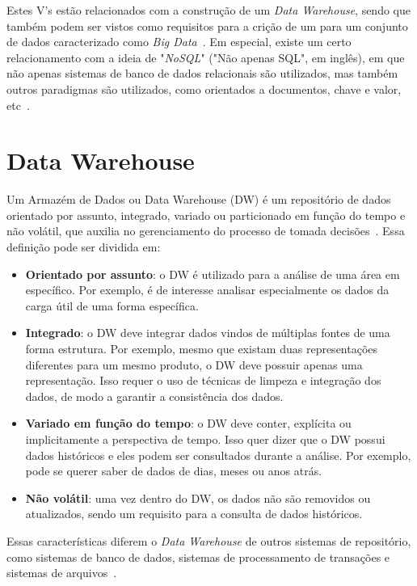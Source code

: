 Estes V's estão relacionados com a construção de um \textit{Data Warehouse}, sendo que também podem ser vistos como requisitos para a crição de um para um conjunto de dados caracterizado como \textit{Big Data}~\cite{zhangBigDataFramework2017}.
Em especial, existe um certo relacionamento com a ideia de "\textit{NoSQL}" ("Não apenas SQL", em inglês), em que não apenas sistemas de banco de dados relacionais são utilizados, mas também outros paradigmas são utilizados, como orientados a documentos, chave e valor, etc~\cite{bimonteOpenIssuesBig2016}.

\section{Data Warehouse}
\label{ch:fun:dw}

Um Armazém de Dados ou Data Warehouse (DW) é um repositório de dados orientado por assunto, integrado, variado ou particionado em função do tempo e não volátil, que auxilia no gerenciamento do processo de tomada decisões~\cite{inmonUsingDataWarehouse1994}.
Essa definição pode ser dividida em:

\begin{itemize}
	\item \textbf{Orientado por assunto}: o DW é utilizado para a análise de uma área em específico.
Por exemplo, é de interesse analisar especialmente os dados da carga útil de uma forma específica.
	\item \textbf{Integrado}: o DW deve integrar dados vindos de múltiplas fontes de uma forma estrutura.
Por exemplo, mesmo que existam duas representações diferentes para um mesmo produto, o DW deve possuir apenas uma representação.
Isso requer o uso de técnicas de limpeza e integração dos dados, de modo a garantir a consistência dos dados.
	\item \textbf{Variado em função do tempo}: o DW deve conter, explícita ou implicitamente a perspectiva de tempo.
Isso quer dizer que o DW possui dados históricos e eles podem ser consultados durante a análise.
Por exemplo, pode se querer saber de dados de dias, meses ou anos atrás.
	\item \textbf{Não volátil}: uma vez dentro do DW, os dados não são removidos ou atualizados, sendo um requisito para a consulta de dados históricos.
\end{itemize}

Essas características diferem o \textit{Data Warehouse} de outros sistemas de repositório, como sistemas de banco de dados, sistemas de processamento de transações e sistemas de arquivos~\cite{hanDataMiningConcepts2011}.

